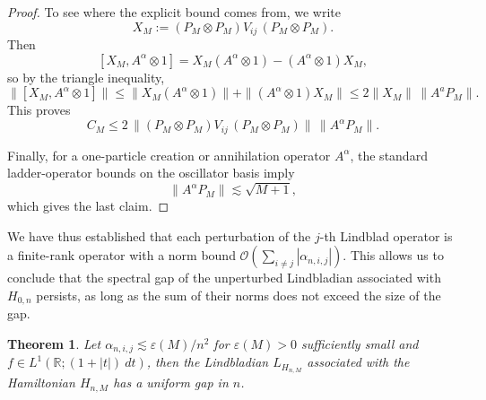 \documentclass[11pt]{amsart}
\newcommand{\1}{\mathbbm{1}}
\theoremstyle{plain}
\newtheorem{theorem}{Theorem}[section]
\theoremstyle{definition}
\theoremstyle{remark}
\numberwithin{equation}{section}
\begin{document}
\begin{proof}
To see where the explicit bound comes from, we write
\[
X_M:=(P_M\otimes P_M)V_{ij}\,(P_M\otimes P_M).
\]
Then
\[
[X_M,A^\alpha\otimes 1]=X_M(A^\alpha\otimes 1)-(A^\alpha\otimes 1)X_M,
\]
so by the triangle inequality,
\[
\|[X_M,A^\alpha\otimes 1]\|
\le \|X_M(A^\alpha\otimes 1)\|+\|(A^\alpha\otimes 1)X_M\|
\le 2\|X_M\|\,\|A^a P_M\|.
\]
This proves
\[
C_M\le 2\,\bigl\|(P_M\otimes P_M)V_{ij}\,(P_M\otimes P_M)\bigr\|\,\|A^\alpha P_M\|.
\]

Finally, for a one-particle creation or annihilation operator \(A^\alpha\), the standard ladder-operator bounds on the oscillator basis imply
\[
\|A^\alpha P_M\|\lesssim \sqrt{M+1},
\]
which gives the last claim.
\end{proof}

We have thus established that each perturbation of the $j$-th Lindblad operator is a finite-rank operator with a norm bound $\mathcal O(\sum_{i\neq j}|\alpha_{n,i,j}|).$ This allows us to conclude that the spectral gap of the unperturbed Lindbladian associated with $H_{0,n}$ persists, as long as the sum of their norms does not exceed the size of the gap. 
\begin{theorem}
\label{thm:uniform_gap}
Let $\alpha_{n,i,j} \lesssim \varepsilon(M)/ n^{2}$ for $\varepsilon(M) >0$ sufficiently small and $f \in L^1(\mathbb R; (1+|t|) \ dt)$, then the Lindbladian $L_{H_{n,M}}$ associated with the Hamiltonian $H_{n,M}$ has a uniform gap in $n$.
\end{theorem}
\end{document}
